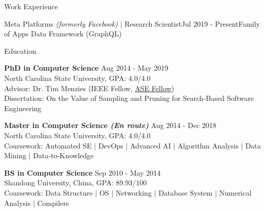 \documentclass{resume} %
\begin{document}
\begin{rSection}{Work Experience}
\begin{rSubsection}{Meta Platforms \textit{(formerly Facebook)} $|$ Research Scientist}{Jul 2019 - Present}{Family of Apps Data Framework (GraphQL)}{}
\end{rSubsection}

\end{rSection}


\begin{rSection}{Education}

{\bf PhD in Computer Science} \hfill {Aug 2014 - May 2019}\\ 
North Carolina State University, GPA: 4.0/4.0  \\
Advisor: Dr. Tim Menzies (IEEE Fellow, \href{https://ase-conferences.org/ase-fellows.html}{ASE Fellow}) \\
Dissertation: On the Value of Sampling and Pruning for Search-Based Software Engineering

{\bf Master in Computer Science {\it (En route)}} \hfill {Aug 2014 - Dec 2018}\\ 
North Carolina State University, GPA: 4.0/4.0  \\
Coursework: Automated SE $|$ DevOps $|$ Advanced AI $|$ Algorithm Analysis $|$ Data Mining $|$ Data-to-Knowledge

{\bf BS in Computer Science} \hfill {Sep 2010 - May 2014}\\ 
Shandong University, China, GPA: 89.93/100  \\
Coursework: Data Structure $|$ OS $|$ Networking $|$ Database System $|$ Numerical Analysis $|$ Compilers

\end{rSection} 

\end{document}
